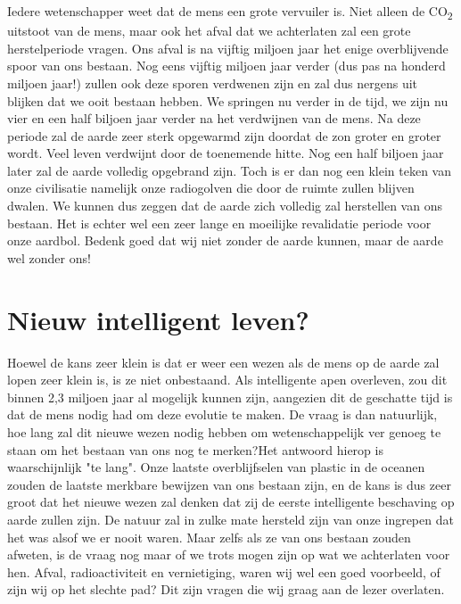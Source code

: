 \newline\newline
Iedere wetenschapper weet dat de mens een grote vervuiler is. Niet alleen de \texorpdfstring{CO\textsubscript{2}}{2} uitstoot van de mens, maar ook het afval dat we achterlaten zal een grote herstelperiode vragen. Ons afval is na vijftig miljoen jaar het enige overblijvende spoor van ons bestaan. Nog eens vijftig miljoen jaar verder (dus pas na honderd miljoen jaar!) zullen ook deze sporen verdwenen zijn en zal dus nergens uit blijken dat we ooit bestaan hebben.
\newline\newline
We springen nu verder in de tijd, we zijn nu vier en een half biljoen jaar verder na het verdwijnen van de mens. Na deze periode zal de aarde zeer sterk opgewarmd zijn doordat de zon groter en groter wordt. Veel leven verdwijnt door de toenemende hitte. Nog een half biljoen jaar later zal de aarde volledig opgebrand zijn. Toch is er dan nog een klein teken van onze civilisatie namelijk onze radiogolven die door de ruimte zullen blijven dwalen.
\newline
\newline
We kunnen dus zeggen dat de aarde zich volledig zal herstellen van ons bestaan. Het is echter wel een zeer lange en moeilijke revalidatie periode voor onze aardbol. Bedenk goed dat wij niet zonder de aarde kunnen, maar de aarde wel zonder ons!
\newpage
\section{Nieuw intelligent leven?}
Hoewel de kans zeer klein is dat er weer een wezen als de mens op de aarde zal lopen zeer klein is, is ze niet onbestaand. Als intelligente apen overleven, zou dit binnen 2,3 miljoen jaar al mogelijk kunnen zijn, aangezien dit de geschatte tijd is dat de mens nodig had om deze evolutie te maken. \cite{monkey} De vraag is dan natuurlijk, hoe lang zal dit nieuwe wezen nodig hebben om wetenschappelijk ver genoeg te staan om het bestaan van ons nog te merken?\newline\newline Het antwoord hierop is waarschijnlijk "te lang". Onze laatste overblijfselen van plastic in de oceanen zouden de laatste merkbare bewijzen van ons bestaan zijn, en de kans is dus zeer groot dat het nieuwe wezen zal denken dat zij de eerste intelligente beschaving op aarde zullen zijn. De natuur zal in zulke mate hersteld zijn van onze ingrepen dat het was alsof we er nooit waren. \cite{standaard} \newline\newline
Maar zelfs als ze van ons bestaan zouden afweten, is de vraag nog maar of we trots mogen zijn op wat we achterlaten voor hen. Afval, radioactiviteit en vernietiging, waren wij wel een goed voorbeeld, of zijn wij op het slechte pad? Dit zijn vragen die wij graag aan de lezer overlaten.\newpage

